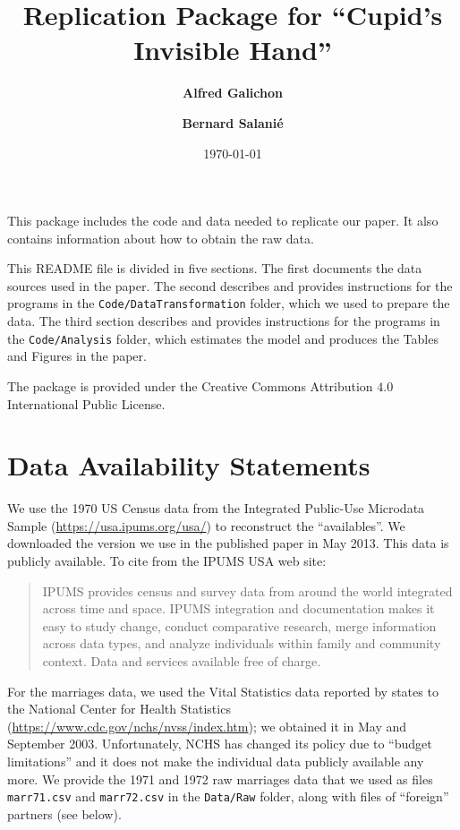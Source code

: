 \documentclass[11pt]{article}
\theoremstyle{plain}
\theoremstyle{definition}
\begin{document}
\title{\textbf{Replication Package for  ``Cupid's Invisible Hand''}}
\author{\textbf{Alfred Galichon} \and \textbf{Bernard Salani\'e}}
\date{\today}

\maketitle

This package includes the code and data needed to replicate our paper. It also contains information about how to obtain the raw data. 

This README file is divided in five sections. The first documents the data sources used in the paper. The second describes and provides instructions for the programs in the \verb|Code/DataTransformation|  folder, which we used to  prepare  the data. The third section describes and provides instructions for the programs in the \verb|Code/Analysis|  folder, which estimates the model and produces the Tables and Figures in the paper. 

The package is provided under the Creative Commons Attribution $4.0$ International Public License.

\section{Data Availability Statements}
We use the 1970 US Census data from the Integrated Public-Use Microdata Sample  (\url{https://usa.ipums.org/usa/})  to reconstruct the ``availables''. We downloaded the version we use in the published paper in    May 2013. This 
 data is publicly available.
To cite from the  IPUMS USA web site:
\begin{quote}
    IPUMS provides census and survey data from around the world integrated across time and space. IPUMS integration and documentation makes it easy to study change, conduct comparative research, merge information across data types, and analyze individuals within family and community context. Data and services available free of charge.
\end{quote}

For the marriages data, we used the Vital Statistics data reported by states to the National Center for Health Statistics  (\url{https://www.cdc.gov/nchs/nvss/index.htm}); we obtained it in May and September 2003. Unfortunately, NCHS has changed its policy due to ``budget limitations'' and it does not make the individual data publicly available any more. We provide the 1971 and 1972 raw marriages data that we used as files \verb|marr71.csv| and \verb|marr72.csv| in the \verb|Data/Raw| folder, along with files of ``foreign'' partners (see below).
\end{document}
